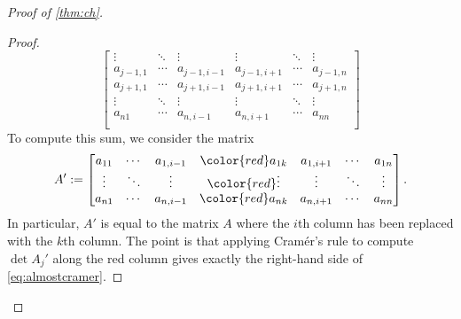 \begin{proof}[Proof of \autoref{thm:ch}]
\begin{proof}
\[\begin{bmatrix}
			\vdots & \ddots & \vdots & \vdots & \ddots & \vdots \\
			a_{j-1,1} & \cdots & a_{j-1,i-1} & a_{j-1,i+1} & \cdots & a_{j-1,n} \\
			a_{j+1,1} & \cdots & a_{j+1,i-1} & a_{j+1,i+1} & \cdots & a_{j+1,n} \\
			\vdots & \ddots & \vdots & \vdots & \ddots & \vdots \\
			a_{n1} & \cdots & a_{n,i-1} & a_{n,i+1} & \cdots & a_{nn} \\
		\end{bmatrix}\tag{$*$}\label{eq:almostcramer}\]
		To compute this sum, we consider the matrix
		\[A':=\begin{bmatrix}
			a_{11} & \cdots & a_{1,i-1} & \color{red}a_{1k} & a_{1,i+1} & \cdots & a_{1n} \\
			\vdots & \ddots & \vdots & \color{red}\vdots & \vdots & \ddots & \vdots \\
			a_{n1} & \cdots & a_{n,i-1} & \color{red}a_{nk} & a_{n,i+1} & \cdots & a_{nn} \\
		\end{bmatrix}.\]
		In particular, $A'$ is equal to the matrix $A$ where the $i$th column has been replaced with the $k$th column. The point is that applying Cram\'er's rule to compute $\det A_j'$ along the red column gives exactly the right-hand side of \autoref{eq:almostcramer}.


\end{proof}
\end{proof}
